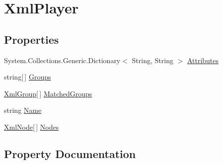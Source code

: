 \hypertarget{classOTA_1_1Permissions_1_1XmlPlayer}{}\section{Xml\+Player}
\label{classOTA_1_1Permissions_1_1XmlPlayer}
\subsection*{Properties}
\begin{DoxyCompactItemize}
\item 
System.\+Collections.\+Generic.\+Dictionary$<$ String, String $>$ \hyperlink{classOTA_1_1Permissions_1_1XmlPlayer_a7d2f22a63a9fbbbe5c87cfc3cbbe39ba}{Attributes}
\item 
string\mbox{[}$\,$\mbox{]} \hyperlink{classOTA_1_1Permissions_1_1XmlPlayer_a397f9bbc0813f8cfaea4caca53fa26b9}{Groups}
\item 
\hyperlink{classOTA_1_1Permissions_1_1XmlGroup}{Xml\+Group}\mbox{[}$\,$\mbox{]} \hyperlink{classOTA_1_1Permissions_1_1XmlPlayer_a1543f1df925f75134ab467795ce3c509}{Matched\+Groups}
\item 
string \hyperlink{classOTA_1_1Permissions_1_1XmlPlayer_a7ee9065718e6628dc7791b756fa6c0f9}{Name}
\item 
\hyperlink{classOTA_1_1Permissions_1_1XmlNode}{Xml\+Node}\mbox{[}$\,$\mbox{]} \hyperlink{classOTA_1_1Permissions_1_1XmlPlayer_ab61d6546169a00b2514bab86c33e487d}{Nodes}
\end{DoxyCompactItemize}


\subsection{Property Documentation}
\hypertarget{classOTA_1_1Permissions_1_1XmlPlayer_a7d2f22a63a9fbbbe5c87cfc3cbbe39ba}{}
